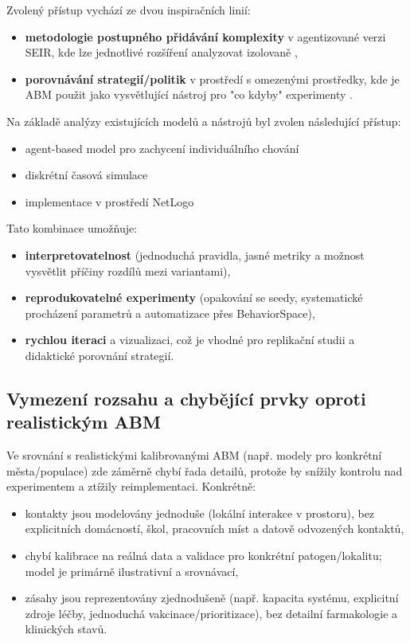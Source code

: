 \documentclass{article}
\begin{document}
Zvolený přístup vychází ze dvou inspiračních linií:
\begin{itemize}
\item \textbf{metodologie postupného přidávání komplexity} v agentizované verzi SEIR, kde lze jednotlivé rozšíření analyzovat izolovaně \cite{hunter-kelleher-2022},
\item \textbf{porovnávání strategií/politik} v prostředí s omezenými prostředky, kde je ABM použit jako vysvětlující nástroj pro "co kdyby" experimenty \cite{adam-arduin-2022}.
\end{itemize}

Na základě analýzy existujících modelů a nástrojů byl zvolen následující přístup:

\begin{itemize}
\item agent-based model pro zachycení individuálního chování
\item diskrétní časová simulace
\item implementace v prostředí NetLogo
\end{itemize}

Tato kombinace umožňuje:

\begin{itemize}
\item \textbf{interpretovatelnost} (jednoduchá pravidla, jasné metriky a možnost vysvětlit příčiny rozdílů mezi variantami),
\item \textbf{reprodukovatelné experimenty} (opakování se seedy, systematické procházení parametrů a automatizace přes BehaviorSpace),
\item \textbf{rychlou iteraci} a vizualizaci, což je vhodné pro replikační studii a didaktické porovnání strategií.
\end{itemize}

\subsection*{Vymezení rozsahu a chybějící prvky oproti realistickým ABM}

Ve srovnání s realistickými kalibrovanými ABM (např. modely pro konkrétní města/populace) zde záměrně chybí řada detailů, protože by snížily kontrolu nad experimentem a ztížily reimplementaci. Konkrétně:
\begin{itemize}
\item kontakty jsou modelovány jednoduše (lokální interakce v prostoru), bez explicitních domácností, škol, pracovních míst a datově odvozených kontaktů,
\item chybí kalibrace na reálná data a validace pro konkrétní patogen/lokalitu; model je primárně ilustrativní a srovnávací,
\item zásahy jsou reprezentovány zjednodušeně (např. kapacita systému, explicitní zdroje léčby, jednoduchá vakcinace/prioritizace), bez detailní farmakologie a klinických stavů.
\end{itemize}
\end{document}
